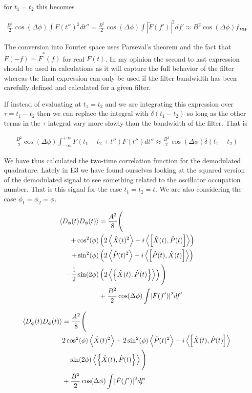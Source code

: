 \documentclass[12pt]{article}
\begin{document}
for $t_1 = t_2$ this becomes

\begin{align}
\frac{B^2}{2}\cos(\Delta\phi)\int F(t'')^2 dt'' = \frac{B^2}{2}\cos(\Delta\phi)\int |\tilde{F}(f')|^2df' \approx B^2 \cos(\Delta\phi) f_{BW}
\end{align}

The conversion into Fourier space uses Parseval's theorem and the fact that $\tilde{F}(-f) = \tilde{F}^*(f)$ for real $F(t)$. In my opinion the second to last expression should be used in calculations as it will capture the full behavior of the filter whereas the final expression can only be used if the filter bandwidth has been carefully defined and calculated for a given filter.

If instead of evaluating at $t_1 = t_2$ and we are integrating this expression over $\tau = t_1-t_2$ then we can replace the integral with $\delta(t_1-t_2)$ so long as the other terms in the $\tau$ integral vary more slowly than the bandwidth of the filter. That is

\begin{align}
\frac{B^2}{2}\cos(\Delta\phi)\int_{-\infty}^{+\infty}F(t_1-t_2+t'')F(t'')dt'' \approx \frac{B^2}{2}\cos(\Delta \phi)\delta(t_1-t_2)
\end{align}

We have thus calculated the two-time correlation function for the demodulated quadrature. Lately in E3 we have found ourselves looking at the squared version of the demodulated signal to see something related to the oscillator occupation number. That is this signal for the case $t_1 = t_2 = t$. We are also considering the case $\phi_1 = \phi_2 = \phi$.

\begin{align}
\Braket{D_{\phi}(t)D_{\phi}(t)} &=\frac{A^2}{8}\Bigg(\\
+\cos^2(\phi)&\left(2\Braket{\hat{X}(t)^2}+i\Braket{\left[\hat{X}(t),\hat{P}(t)\right]}\right)\\
+\sin^2(\phi)&\left(2\Braket{\hat{P}(t)^2}-i\Braket{\left[\hat{P}(t),\hat{X}(t)\right]}\right)\\
-\frac{1}{2}\sin(2\phi)&\left(2\Braket{\left\{\hat{X}(t),\hat{P}(t)\right\}}\right)\Bigg)\\
&+\frac{B^2}{2}\cos(\Delta\phi)\int \lvert \tilde{F}(f')\rvert^2 df'
\end{align}

\begin{align}
\Braket{D_{\phi}(t)D_{\phi}(t)} &=\frac{A^2}{8}\Bigg(\\
& 2\cos^2(\phi)\Braket{\hat{X}(t)^2} + 2 \sin^2(\phi) \Braket{\hat{P}(t)^2} + i \Braket{\left[\hat{X}(t),\hat{P}(t)\right]}\\
&-\sin(2\phi)\Braket{\left\{\hat{X}(t),\hat{P}(t)\right\}}\Bigg)\\
&+\frac{B^2}{2}\cos(\Delta\phi)\int \lvert \tilde{F}(f')\rvert^2 df'
\end{align}
\end{document}
